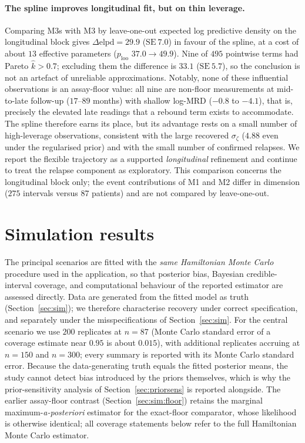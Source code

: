 \documentclass[11pt]{article}
\begin{document}
\paragraph{The spline improves longitudinal fit, but on thin leverage.}
Comparing M3s with M3 by leave-one-out expected log predictive density on the
longitudinal block gives $\Delta\mathrm{elpd}=29.9$ ($\mathrm{SE}\ 7.0$) in
favour of the spline, at a cost of about $13$ effective parameters
($p_{\mathrm{loo}}$ $37.0\to49.9$). Nine of $495$ pointwise terms had Pareto
$\hat k>0.7$; excluding them the difference is $33.1$ ($\mathrm{SE}\ 5.7$), so
the conclusion is not an artefact of unreliable approximations. Notably, none
of these influential observations is an assay-floor value: all nine are
non-floor measurements at mid-to-late follow-up ($17$--$89$ months) with
shallow log-MRD ($-0.8$ to $-4.1$), that is, precisely the elevated late
readings that a rebound term exists to accommodate. The spline therefore earns
its place, but its advantage rests on a small number of high-leverage
observations, consistent with the large recovered $\sigma_\zeta$ ($4.88$ even
under the regularised prior) and with the small number of confirmed relapses.
We report the flexible trajectory as a supported \emph{longitudinal}
refinement and continue to treat the relapse component as exploratory. This
comparison concerns the longitudinal block only; the event contributions of M1
and M2 differ in dimension ($275$ intervals versus $87$ patients) and are not
compared by leave-one-out.

\section{Simulation results}
\label{sec:simresults}

The principal scenarios are fitted with the \emph{same Hamiltonian Monte Carlo}
procedure used in the application, so that posterior bias, Bayesian
credible-interval coverage, and computational behaviour of the reported
estimator are assessed directly. Data are generated from the fitted model as
truth (Section~\ref{sec:sim}); we therefore characterise recovery under correct
specification, and separately under the misspecifications of
Section~\ref{sec:sim}. For the central scenario we use $200$ replicates at
$n=87$ (Monte Carlo standard error of a coverage estimate near $0.95$ is about
$0.015$), with additional replicates accruing at $n=150$ and $n=300$; every
summary is reported with its Monte Carlo standard error. Because the
data-generating truth equals the fitted posterior means, the study cannot
detect bias introduced by the priors themselves, which is why the
prior-sensitivity analysis of Section~\ref{sec:priorsens} is reported
alongside. The earlier assay-floor contrast (Section~\ref{sec:sim:floor})
retains the marginal maximum-\emph{a-posteriori} estimator for the exact-floor
comparator, whose likelihood is otherwise identical; all coverage statements
below refer to the full Hamiltonian Monte Carlo estimator.
\end{document}
